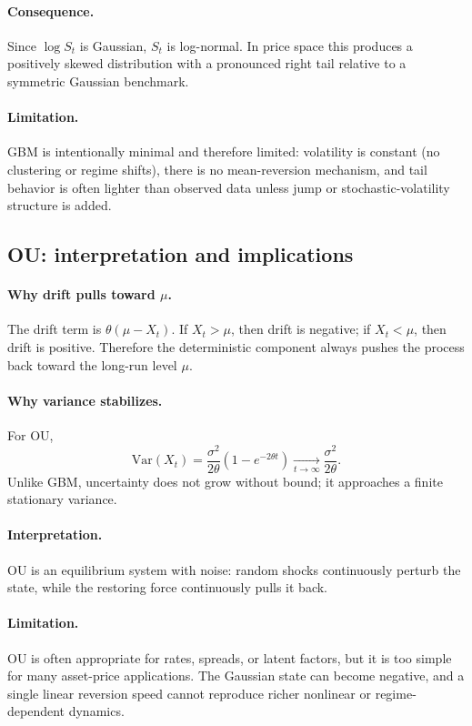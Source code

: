 \documentclass[11pt]{article}
\newcommand{\Var}{\mathrm{Var}}
\begin{document}
\paragraph{Consequence.}
Since $\log S_t$ is Gaussian, $S_t$ is log-normal. In price space this produces a positively skewed distribution with a pronounced right tail relative to a symmetric Gaussian benchmark.

\paragraph{Limitation.}
GBM is intentionally minimal and therefore limited: volatility is constant (no clustering or regime shifts), there is no mean-reversion mechanism, and tail behavior is often lighter than observed data unless jump or stochastic-volatility structure is added.

\subsection{OU: interpretation and implications}

\paragraph{Why drift pulls toward $\mu$.}
The drift term is $\theta(\mu-X_t)$. If $X_t>\mu$, then drift is negative; if $X_t<\mu$, then drift is positive. Therefore the deterministic component always pushes the process back toward the long-run level $\mu$.

\paragraph{Why variance stabilizes.}
For OU,
\begin{equation}
  \Var(X_t) = \frac{\sigma^2}{2\theta}\left(1-e^{-2\theta t}\right)
  \xrightarrow[t\to\infty]{}
  \frac{\sigma^2}{2\theta}.
\end{equation}
Unlike GBM, uncertainty does not grow without bound; it approaches a finite stationary variance.

\paragraph{Interpretation.}
OU is an equilibrium system with noise: random shocks continuously perturb the state, while the restoring force continuously pulls it back.

\paragraph{Limitation.}
OU is often appropriate for rates, spreads, or latent factors, but it is too simple for many asset-price applications. The Gaussian state can become negative, and a single linear reversion speed cannot reproduce richer nonlinear or regime-dependent dynamics.
\end{document}
